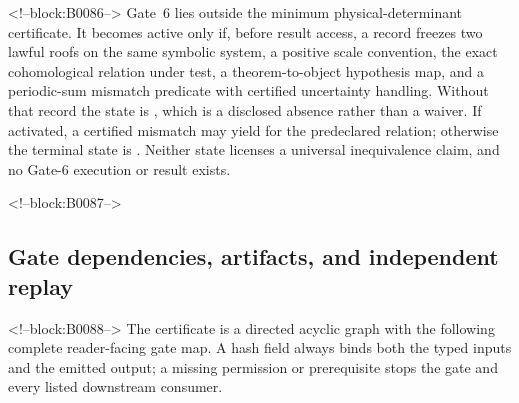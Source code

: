 \documentclass[11pt,a4paper]{article}
\begin{document}
<!--block:B0086-->
Gate~6 lies outside the minimum physical-determinant certificate. It becomes active only if, before result access, a record freezes two lawful roofs on the same symbolic system, a positive scale convention, the exact cohomological relation under test, a theorem-to-object hypothesis map, and a periodic-sum mismatch predicate with certified uncertainty handling. Without that record the state is , which is a disclosed absence rather than a waiver. If activated, a certified mismatch may yield  for the predeclared relation; otherwise the terminal state is . Neither state licenses a universal inequivalence claim, and no Gate-6 execution or result exists.

<!--block:B0087-->
\subsection{Gate dependencies, artifacts, and independent replay}

<!--block:B0088-->
The certificate is a directed acyclic graph with the following complete
reader-facing gate map.  A hash field always binds both the typed inputs and the
emitted output; a missing permission or prerequisite stops the gate and every
listed downstream consumer.
\end{document}
